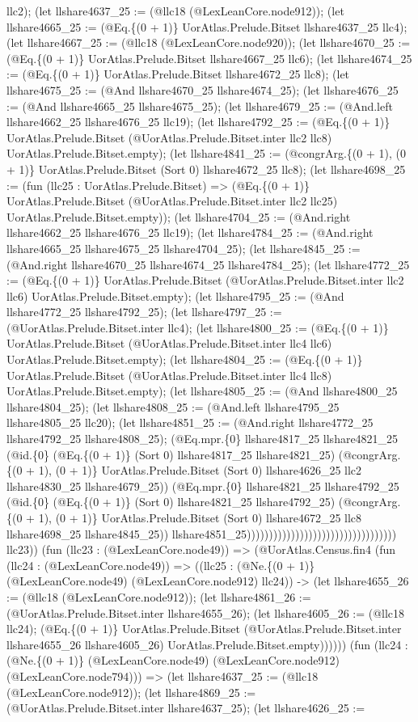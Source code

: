 \documentclass[11pt]{article}
\begin{document}
llc2); (let llshare4637\_25 := (@llc18 (@LexLeanCore.node912)); (let llshare4665\_25 := (@Eq.\{(0 + 1)\} UorAtlas.Prelude.Bitset llshare4637\_25 llc4); (let llshare4667\_25 := (@llc18 (@LexLeanCore.node920)); (let llshare4670\_25 := (@Eq.\{(0 + 1)\} UorAtlas.Prelude.Bitset llshare4667\_25 llc6); (let llshare4674\_25 := (@Eq.\{(0 + 1)\} UorAtlas.Prelude.Bitset llshare4672\_25 llc8); (let llshare4675\_25 := (@And llshare4670\_25 llshare4674\_25); (let llshare4676\_25 := (@And llshare4665\_25 llshare4675\_25); (let llshare4679\_25 := (@And.left llshare4662\_25 llshare4676\_25 llc19); (let llshare4792\_25 := (@Eq.\{(0 + 1)\} UorAtlas.Prelude.Bitset (@UorAtlas.Prelude.Bitset.inter llc2 llc8) UorAtlas.Prelude.Bitset.empty); (let llshare4841\_25 := (@congrArg.\{(0 + 1), (0 + 1)\} UorAtlas.Prelude.Bitset (Sort 0) llshare4672\_25 llc8); (let llshare4698\_25 := (fun (llc25 : UorAtlas.Prelude.Bitset) => (@Eq.\{(0 + 1)\} UorAtlas.Prelude.Bitset (@UorAtlas.Prelude.Bitset.inter llc2 llc25) UorAtlas.Prelude.Bitset.empty)); (let llshare4704\_25 := (@And.right llshare4662\_25 llshare4676\_25 llc19); (let llshare4784\_25 := (@And.right llshare4665\_25 llshare4675\_25 llshare4704\_25); (let llshare4845\_25 := (@And.right llshare4670\_25 llshare4674\_25 llshare4784\_25); (let llshare4772\_25 := (@Eq.\{(0 + 1)\} UorAtlas.Prelude.Bitset (@UorAtlas.Prelude.Bitset.inter llc2 llc6) UorAtlas.Prelude.Bitset.empty); (let llshare4795\_25 := (@And llshare4772\_25 llshare4792\_25); (let llshare4797\_25 := (@UorAtlas.Prelude.Bitset.inter llc4); (let llshare4800\_25 := (@Eq.\{(0 + 1)\} UorAtlas.Prelude.Bitset (@UorAtlas.Prelude.Bitset.inter llc4 llc6) UorAtlas.Prelude.Bitset.empty); (let llshare4804\_25 := (@Eq.\{(0 + 1)\} UorAtlas.Prelude.Bitset (@UorAtlas.Prelude.Bitset.inter llc4 llc8) UorAtlas.Prelude.Bitset.empty); (let llshare4805\_25 := (@And llshare4800\_25 llshare4804\_25); (let llshare4808\_25 := (@And.left llshare4795\_25 llshare4805\_25 llc20); (let llshare4851\_25 := (@And.right llshare4772\_25 llshare4792\_25 llshare4808\_25); (@Eq.mpr.\{0\} llshare4817\_25 llshare4821\_25 (@id.\{0\} (@Eq.\{(0 + 1)\} (Sort 0) llshare4817\_25 llshare4821\_25) (@congrArg.\{(0 + 1), (0 + 1)\} UorAtlas.Prelude.Bitset (Sort 0) llshare4626\_25 llc2 llshare4830\_25 llshare4679\_25)) (@Eq.mpr.\{0\} llshare4821\_25 llshare4792\_25 (@id.\{0\} (@Eq.\{(0 + 1)\} (Sort 0) llshare4821\_25 llshare4792\_25) (@congrArg.\{(0 + 1), (0 + 1)\} UorAtlas.Prelude.Bitset (Sort 0) llshare4672\_25 llc8 llshare4698\_25 llshare4845\_25)) llshare4851\_25)))))))))))))))))))))))))))))))))) llc23)) (fun (llc23 : (@LexLeanCore.node49)) => (@UorAtlas.Census.fin4 (fun (llc24 : (@LexLeanCore.node49)) => ((llc25 : (@Ne.\{(0 + 1)\} (@LexLeanCore.node49) (@LexLeanCore.node912) llc24)) -> (let llshare4655\_26 := (@llc18 (@LexLeanCore.node912)); (let llshare4861\_26 := (@UorAtlas.Prelude.Bitset.inter llshare4655\_26); (let llshare4605\_26 := (@llc18 llc24); (@Eq.\{(0 + 1)\} UorAtlas.Prelude.Bitset (@UorAtlas.Prelude.Bitset.inter llshare4655\_26 llshare4605\_26) UorAtlas.Prelude.Bitset.empty)))))) (fun (llc24 : (@Ne.\{(0 + 1)\} (@LexLeanCore.node49) (@LexLeanCore.node912) (@LexLeanCore.node794))) => (let llshare4637\_25 := (@llc18 (@LexLeanCore.node912)); (let llshare4869\_25 := (@UorAtlas.Prelude.Bitset.inter llshare4637\_25); (let llshare4626\_25 := 
\end{document}
